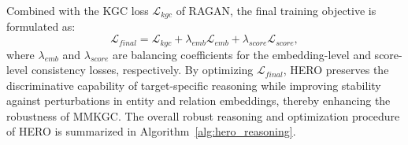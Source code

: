 \documentclass[a4paper,fleqn]{cas-sc}
\begin{document}
Combined with the KGC loss $\mathcal{L}_{kgc}$ of RAGAN, the final training objective is formulated as:
\begin{equation}
\mathcal{L}_{final}
=
\mathcal{L}_{kgc}
+
\lambda_{emb}\mathcal{L}_{emb}
+
\lambda_{score}\mathcal{L}_{score},
\end{equation}
where $\lambda_{emb}$ and $\lambda_{score}$ are balancing coefficients for the embedding-level and score-level consistency losses, respectively. By optimizing $\mathcal{L}_{final}$, HERO preserves the discriminative capability of target-specific reasoning while improving stability against perturbations in entity and relation embeddings, thereby enhancing the robustness of MMKGC. The overall robust reasoning and optimization procedure of HERO is summarized in Algorithm~\ref{alg:hero_reasoning}.
\end{document}
